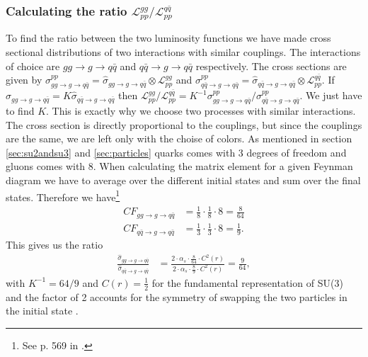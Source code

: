 \subsubsection{Calculating the ratio ${\mathcal{L}_{pp}^{gg}}/{\mathcal{L}_{pp}^{q \bar q}}$}
To find the ratio between the two luminosity functions we have made cross sectional distributions of two interactions with similar couplings. The interactions of choice are  $gg \rightarrow g \rightarrow q \bar q$ and $q \bar q \rightarrow g \rightarrow q \bar q$ respectively. The cross sections are given by  $\sigma^{pp}_{gg \rightarrow g \rightarrow q \bar q}=\hat \sigma_{gg \rightarrow g \rightarrow q \bar q} \otimes \mathcal{L}_{pp}^{gg}$ and $\sigma^{pp}_{q \bar q \rightarrow g \rightarrow q \bar q}= \hat \sigma_{q \bar q \rightarrow g \rightarrow q \bar q} \otimes \mathcal{L}_{pp}^{q \bar q}$. If $\hat \sigma_{gg \rightarrow g \rightarrow q \bar q} = K \hat \sigma_{q \bar q \rightarrow g \rightarrow q \bar q}$ then $\mathcal{L}_{pp}^{gg}/\mathcal{L}_{pp}^{q \bar q} = K^{-1} \sigma^{pp}_{gg \rightarrow g \rightarrow q \bar q}/\sigma^{pp}_{q \bar q \rightarrow g \rightarrow q \bar q}$. We just have to find $K$. This is exactly why we choose two processes with similar interactions. The cross section is directly proportional to the couplings, but since the couplings are the same, we are left only with the choise of colors. As mentioned in section \ref{sec:su2andsu3} and \ref{sec:particles} quarks comes with 3 degrees of freedom and gluons comes with 8. When calculating the matrix element for a given Feynman diagram we have to average over the different initial states and sum over the final states. Therefore we have\footnote{See p. 569 in  \cite{peskin1993iqf}.}
\begin{align}
	CF_{gg \rightarrow g \rightarrow q \bar q}&=\frac{1}{8} \cdot \frac{1}{8} \cdot 8=\frac{8}{64}\\
	CF_{q \bar q \rightarrow g \rightarrow q \bar q}&=\frac{1}{3} \cdot \frac{1}{3} \cdot 8=\frac{1}{9}.
\end{align}
This gives us the ratio
\begin{align}
	\frac{\hat \sigma_{gg \rightarrow g \rightarrow q \bar q}}{\hat \sigma_{q \bar q \rightarrow g \rightarrow q \bar q}} &=\frac{2 \cdot \alpha_{s} \cdot \frac{8}{64} \cdot C^{2}(r)}{2 \cdot \alpha_{s} \cdot \frac{8}{9} \cdot C^{2}(r)}=\frac{9}{64},
\end{align}
with $K^{-1}=64/9$ and $C(r) = \frac{1}{2}$ for the fundamental representation of SU(3) and the factor of 2 accounts for the symmetry of swapping the two particles in the initial state \cite{peskin1993iqf}.

